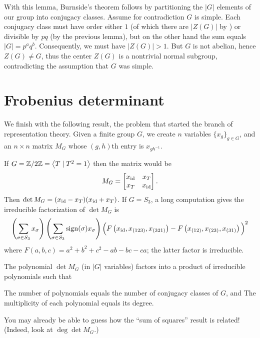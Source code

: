 With this lemma, Burnside's theorem follows by partitioning
the $|G|$ elements of our group into conjugacy classes.
Assume for contradiction $G$ is simple.
Each conjugacy class must have order either $1$ (of which there are $|Z(G)|$ by )
or divisible by $pq$ (by the previous lemma), but on the other hand the sum equals $|G| = p^aq^b$.
Consequently, we must have $|Z(G)| > 1$.
But $G$ is not abelian, hence $Z(G) \neq G$,
thus the center $Z(G)$ is a nontrivial normal subgroup,
contradicting the assumption that $G$ was simple.



\section{Frobenius determinant}
We finish with the following result,
the problem that started the branch of representation theory.
Given a finite group $G$,
we create $n$ variables $\{x_g\}_{g \in G}$,
and an $n \times n$ matrix $M_G$ whose $(g,h)$th entry is $x_{gh^{-1}}$.
\begin{example}
	\listhack
	\begin{enumerate}[(a)]
	\ii If $G = \mathbb Z/2\mathbb Z = \left< T \mid T^2 = 1\right>$
	then the matrix would be \[ M_G =
	\begin{bmatrix} x_{\mathrm{id}} & x_T \\ x_T & x_{\mathrm{id}} \end{bmatrix}. \]
	Then $\det M_G = (x_{\mathrm{id}}-x_T)(x_{\mathrm{id}}+x_T)$.
	\ii If $G = S_3$, a long computation gives
	the irreducible factorization of $\det M_G$ is
	\[
		\left( \sum_{\sigma \in S_3} x_{\sigma} \right)
		\left( \sum_{\sigma \in S_3} \operatorname{sign}(\sigma)x_\sigma \right)
		\Big( F\left(x_{\mathrm{id}}, x_{(123)}, x_{(321)}\right)
		- F\left(x_{(12)}, x_{(23)}, x_{(31)}\right) \Big)^2 \]
	where $F(a,b,c) = a^2+b^2+c^2-ab-bc-ca$;
	the latter factor is irreducible.
	\end{enumerate}
\end{example}
\begin{theorem}
	The polynomial $\det M_G$ (in $|G|$ variables) factors
	into a product of irreducible polynomials such that
	\begin{enumerate}[(i)]
		\ii The number of polynomials equals the number
		of conjugacy classes of $G$, and
		\ii The multiplicity of each polynomial
		equals its degree.
	\end{enumerate}
\end{theorem}
You may already be able to guess how the ``sum of squares'' result
is related! (Indeed, look at $\deg\det M_G$.)

